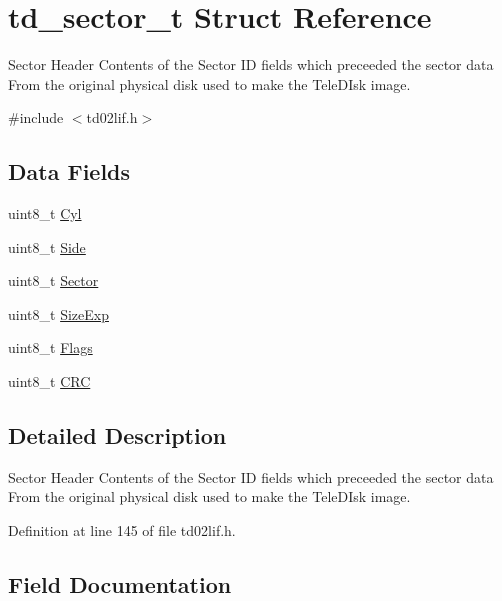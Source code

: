 \hypertarget{structtd__sector__t}{}\section{td\+\_\+sector\+\_\+t Struct Reference}
\label{structtd__sector__t}


Sector Header Contents of the Sector ID fields which preceeded the sector data From the original physical disk used to make the Tele\+D\+Isk image.  




{\ttfamily \#include $<$td02lif.\+h$>$}

\subsection*{Data Fields}
\begin{DoxyCompactItemize}
\item 
uint8\+\_\+t \hyperlink{structtd__sector__t_afddd9f1e3a41cc6e3a9be2478cd3305b}{Cyl}
\item 
uint8\+\_\+t \hyperlink{structtd__sector__t_ae8f05b8d6e903e618f6adec8973221f7}{Side}
\item 
uint8\+\_\+t \hyperlink{structtd__sector__t_a703252220f745cd6adfedadd5cc993d6}{Sector}
\item 
uint8\+\_\+t \hyperlink{structtd__sector__t_addc6d434740a76aebde544a9beab1b6b}{Size\+Exp}
\item 
uint8\+\_\+t \hyperlink{structtd__sector__t_ad30cfc0c6589ff25f8456ada5b352efa}{Flags}
\item 
uint8\+\_\+t \hyperlink{structtd__sector__t_aaccfa1ee85151410b042457fc5b584e5}{C\+RC}
\end{DoxyCompactItemize}


\subsection{Detailed Description}
Sector Header Contents of the Sector ID fields which preceeded the sector data From the original physical disk used to make the Tele\+D\+Isk image. 

Definition at line 145 of file td02lif.\+h.



\subsection{Field Documentation}
